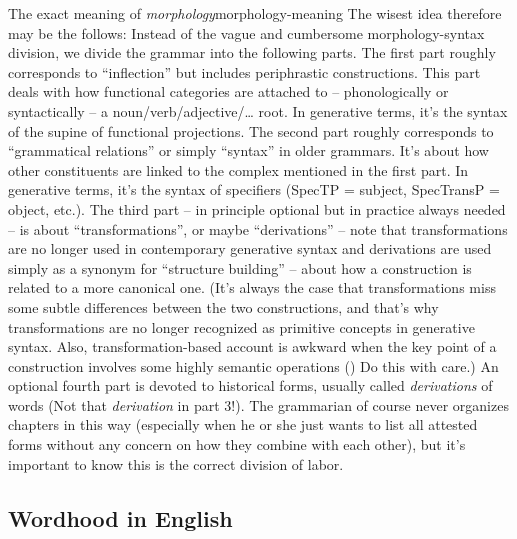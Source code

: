 \documentclass[UTF8, a4paper, oneside, scheme=plain]{ctexrep}
\newcommand*{\term}[1]{\emph{#1}}
\begin{document}
\begin{theorybox}{The exact meaning of \term{morphology}}{morphology-meaning}
    The wisest idea therefore may be the follows:
    Instead of the vague and cumbersome morphology-syntax division,
    we divide the grammar into the following parts.
    The first part roughly corresponds to ``inflection'' 
    but includes periphrastic constructions.
    This part deals with how functional categories are attached to 
    -- phonologically or syntactically -- a noun/verb/adjective/\dots{} root.
    In generative terms, it's the syntax of the supine of functional projections.
    The second part roughly corresponds to ``grammatical relations''
    or simply ``syntax'' in older grammars.
    It's about how other constituents are linked to the complex mentioned in the first part.
    In generative terms, it's the syntax of specifiers (SpecTP = subject, SpecTransP = object, etc.).
    The third part -- in principle optional but in practice always needed -- 
    is about ``transformations'', or maybe ``derivations'' 
    -- note that transformations are no longer used in contemporary generative syntax 
    and derivations are used simply as a synonym for ``structure building'' -- 
    about how a construction is related to a more canonical one.
    (It's always the case that transformations miss some subtle differences between the two constructions,
    and that's why transformations are no longer recognized as primitive concepts in generative syntax.
    Also, transformation-based account is awkward 
    when the key point of a construction involves some highly semantic operations 
    ()
    Do this with care.)
    An optional fourth part is devoted to historical forms,
    usually called \term{derivations} of words (Not that \term{derivation} in part 3!).
    The grammarian of course never organizes chapters in this way
    (especially when he or she just wants to list all attested forms 
    without any concern on how they combine with each other),
    but it's important to know this is the correct division of labor.
\end{theorybox}

\subsection{Wordhood in English}
\end{document}
